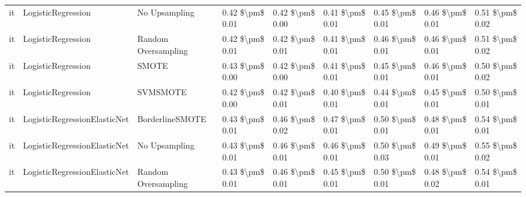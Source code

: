 \begin{tabular}{lllllllll}
      it &              LogisticRegression &                 No Upsampling & 0.42 \$\textbackslash pm\$ 0.01 &           0.42 \$\textbackslash pm\$ 0.00 &       0.41 \$\textbackslash pm\$ 0.01 &        0.45 \$\textbackslash pm\$ 0.01 &                         0.46 \$\textbackslash pm\$ 0.01 &     0.51 \$\textbackslash pm\$ 0.02 \\
      it &              LogisticRegression &           Random Oversampling & 0.42 \$\textbackslash pm\$ 0.01 &           0.42 \$\textbackslash pm\$ 0.01 &       0.41 \$\textbackslash pm\$ 0.01 &        0.46 \$\textbackslash pm\$ 0.01 &                         0.46 \$\textbackslash pm\$ 0.01 &     0.51 \$\textbackslash pm\$ 0.02 \\
      it &              LogisticRegression &                         SMOTE & 0.43 \$\textbackslash pm\$ 0.00 &           0.42 \$\textbackslash pm\$ 0.00 &       0.41 \$\textbackslash pm\$ 0.01 &        0.45 \$\textbackslash pm\$ 0.01 &                         0.46 \$\textbackslash pm\$ 0.01 &     0.50 \$\textbackslash pm\$ 0.02 \\
      it &              LogisticRegression &                      SVMSMOTE & 0.42 \$\textbackslash pm\$ 0.00 &           0.42 \$\textbackslash pm\$ 0.01 &       0.40 \$\textbackslash pm\$ 0.01 &        0.44 \$\textbackslash pm\$ 0.01 &                         0.45 \$\textbackslash pm\$ 0.01 &     0.50 \$\textbackslash pm\$ 0.01 \\
      it &    LogisticRegressionElasticNet &               BorderlineSMOTE & 0.43 \$\textbackslash pm\$ 0.01 &           0.46 \$\textbackslash pm\$ 0.02 &       0.47 \$\textbackslash pm\$ 0.01 &        0.50 \$\textbackslash pm\$ 0.01 &                         0.48 \$\textbackslash pm\$ 0.01 &     0.54 \$\textbackslash pm\$ 0.01 \\
      it &    LogisticRegressionElasticNet &                 No Upsampling & 0.43 \$\textbackslash pm\$ 0.01 &           0.46 \$\textbackslash pm\$ 0.01 &       0.46 \$\textbackslash pm\$ 0.01 &        0.50 \$\textbackslash pm\$ 0.03 &                         0.49 \$\textbackslash pm\$ 0.01 &     0.55 \$\textbackslash pm\$ 0.02 \\
      it &    LogisticRegressionElasticNet &           Random Oversampling & 0.43 \$\textbackslash pm\$ 0.01 &           0.46 \$\textbackslash pm\$ 0.01 &       0.45 \$\textbackslash pm\$ 0.01 &        0.50 \$\textbackslash pm\$ 0.01 &                         0.48 \$\textbackslash pm\$ 0.02 &     0.54 \$\textbackslash pm\$ 0.01 \\

\end{tabular}
